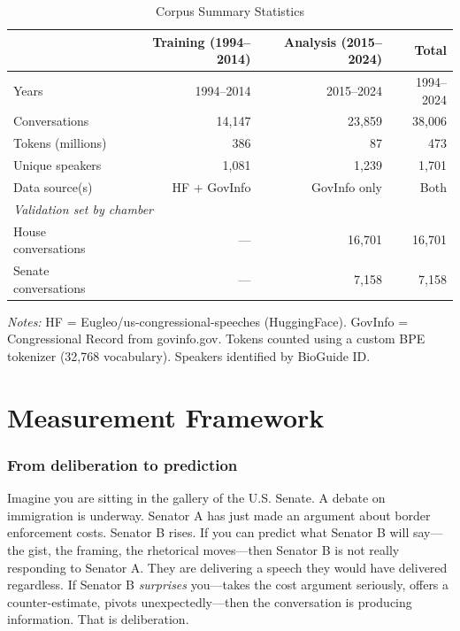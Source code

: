 \documentclass[12pt]{article}
\begin{document}
\begin{table}[H]
\centering
\caption{Corpus Summary Statistics}
\label{tab:corpus}
\begin{threeparttable}
\begin{tabular}{lrrr}
\toprule
& Training (1994--2014) & Analysis (2015--2024) & Total \\
\midrule
Years & 1994--2014 & 2015--2024 & 1994--2024 \\
Conversations & 14,147 & 23,859 & 38,006 \\
Tokens (millions) & 386 & 87 & 473 \\
Unique speakers & 1,081 & 1,239 & 1,701 \\
Data source(s) & HF + GovInfo & GovInfo only & Both \\
\midrule
\multicolumn{4}{l}{\textit{Validation set by chamber}} \\
\quad House conversations & --- & 16,701 & 16,701 \\
\quad Senate conversations & --- & 7,158 & 7,158 \\
\bottomrule
\end{tabular}
\begin{tablenotes}[flushleft]
\small
\item \textit{Notes:} HF = Eugleo/us-congressional-speeches (HuggingFace). GovInfo = Congressional Record from govinfo.gov. Tokens counted using a custom BPE tokenizer (32,768 vocabulary). Speakers identified by BioGuide ID.
\end{tablenotes}
\end{threeparttable}
\end{table}


\section{Measurement Framework}

\subsubsection*{From deliberation to prediction}
Imagine you are sitting in the gallery of the U.S. Senate. A debate on immigration is underway. Senator A has just made an argument about border enforcement costs. Senator B rises. If you can predict what Senator B will say---the gist, the framing, the rhetorical moves---then Senator B is not really responding to Senator A. They are delivering a speech they would have delivered regardless. If Senator B \textit{surprises} you---takes the cost argument seriously, offers a counter-estimate, pivots unexpectedly---then the conversation is producing information. That is deliberation.
\end{document}
